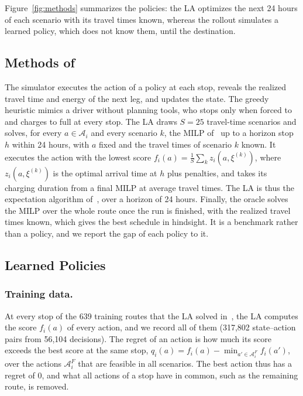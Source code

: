\documentclass[runningheads]{llncs}
\begin{document}
Figure~\ref{fig:methods} summarizes the policies: the LA optimizes the next
24 hours of each scenario with its travel times known, whereas the rollout
simulates a learned policy, which does not know them, until the destination.

\subsection{Methods of~\cite{pagnier2026scheduling}}

The simulator executes the action of a policy at each stop, reveals the
realized travel time and energy of the next leg, and updates the state. The
greedy heuristic mimics a driver without planning tools, who stops only when
forced to and charges to full at every stop. The LA draws $S=25$ travel-time
scenarios and solves, for every $a\in\mathcal{A}_i$ and every scenario $k$,
the MILP of~\cite{pagnier2026scheduling} up to a horizon stop $h$ within 24
hours, with $a$ fixed and the travel times of scenario $k$ known. It executes
the action with the lowest score $f_i(a)=\frac{1}{S}\sum_{k}z_i(a,\xi^{(k)})$,
where $z_i(a,\xi^{(k)})$ is the optimal arrival time at $h$ plus penalties,
and takes its charging duration from a final MILP at average travel times. The
LA is thus the expectation algorithm of~\cite{vanhentenryck2006}, over a
horizon of 24 hours. Finally, the oracle solves the MILP over the whole route
once the run is finished, with the realized travel times known, which gives
the best schedule in hindsight. It is a benchmark rather than a policy, and we
report the gap of each policy to it.

\subsection{Learned Policies}

\subsubsection{Training data.}
At every stop of the 639 training routes that the LA solved
in~\cite{pagnier2026scheduling}, the LA computes the score $f_i(a)$ of every
action, and we record all of them (317{,}802 state--action pairs from 56{,}104
decisions). The regret of an action is how much its score exceeds the best
score at the same stop, $q_i(a)=f_i(a)-\min_{a'\in\mathcal{A}^F_i}f_i(a')$,
over the actions $\mathcal{A}^F_i$ that are feasible in all scenarios. The
best action thus has a regret of 0, and what all actions of a stop have in
common, such as the remaining route, is removed.
\end{document}
